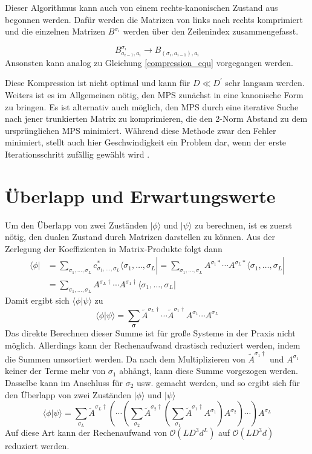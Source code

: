 \documentclass[10pt,a4paper]{report}
\newcommand{\SumIndex}{\sigma_1,\ldots,\sigma_L}
\begin{document}
Dieser Algorithmus kann auch von einem rechts-kanonischen Zustand aus begonnen werden. Dafür werden die Matrizen von links nach rechts komprimiert und die einzelnen Matrizen $B^{\sigma_i}$ werden über den Zeilenindex zusammengefasst.

\begin{equation}
B_{a_{i-1},a_{i}}^{\sigma_i}\rightarrow B_{(\sigma_i,a_{i-1}),a_i}
\end{equation}
Ansonsten kann analog zu Gleichung \ref{compression_equ} vorgegangen werden.

Diese Kompression ist nicht optimal und kann für $D\ll D^\prime$ sehr langsam werden. Weiters ist es im Allgemeinen nötig, den MPS zunächst in eine kanonische Form zu bringen. Es ist alternativ auch möglich, den MPS durch eine iterative Suche nach jener trunkierten Matrix zu komprimieren, die den 2-Norm Abstand zu dem ursprünglichen MPS minimiert. Während diese Methode zwar den Fehler minimiert, stellt auch hier Geschwindigkeit ein Problem dar, wenn der erste Iterationsschritt zufällig gewählt wird \cite{MPS-main}.

\section{Überlapp und Erwartungswerte}\label{MPO}
Um den Überlapp von zwei Zuständen $|\phi\rangle$ und $|\psi\rangle$ zu berechnen, ist es zuerst nötig, den dualen Zustand durch Matrizen darstellen zu können. Aus der Zerlegung der Koeffizienten in Matrix-Produkte folgt dann
\begin{equation}
\begin{split}
\langle\phi|&=\sum_{\SumIndex}c_{\SumIndex}^{\ast}\langle\SumIndex|=\sum_{\SumIndex} A^{\sigma_1\ast}\cdots A^{\sigma_L \ast}\langle\SumIndex|\\
 &= \sum_{\SumIndex}A^{\sigma_L\dagger}\cdots A^{\sigma_1 \dagger}\langle\SumIndex|
\end{split}
\end{equation}
Damit ergibt sich $\langle\phi|\psi\rangle$ zu 
\begin{equation}
\langle\phi|\psi\rangle=\sum_{\bm{\sigma}}\tilde{A}^{\sigma_L \dagger}\cdots\tilde{A}^{\sigma_1 \dagger} A^{\sigma_1}\cdots A^{\sigma_L} 
\end{equation}
Das direkte Berechnen dieser Summe ist für große Systeme in der Praxis nicht möglich. Allerdings kann der Rechenaufwand drastisch reduziert werden, indem die Summen umsortiert werden. Da nach dem Multiplizieren von $\tilde{A}^{\sigma_1\dagger}$ und $A^{\sigma_1}$ keiner der Terme mehr von $\sigma_1$ abhängt, kann diese Summe vorgezogen werden. Dasselbe kann im Anschluss für $\sigma_2$ usw. gemacht werden, und so ergibt sich für den Überlapp von zwei Zuständen $|\phi\rangle$ und $|\psi\rangle$
\begin{equation}
\langle\phi|\psi\rangle=\sum_{\sigma_L}\tilde{A}^{\sigma_L\dagger}\left( \cdots\left(\sum_{\sigma_2}\tilde{A}^{\sigma_2\dagger}\left(\sum_{\sigma_1}\tilde{A}^{\sigma_1\dagger}A^{\sigma_1}\right)A^{\sigma_2}\right)\cdots\right) A^{\sigma_L}
\end{equation}
Auf diese Art kann der Rechenaufwand von $\mathcal{O}(LD^3d^L)$ auf $\mathcal{O}(LD^3d)$ reduziert werden.\\
\end{document}
